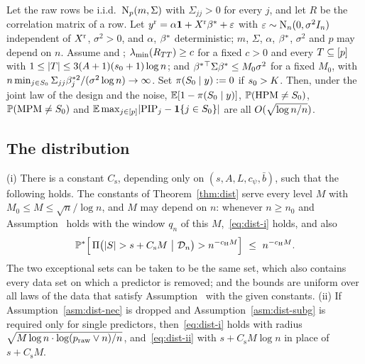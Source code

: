 \begin{supprem}\label{rem:thm2x}
Let the raw rows be i.i.d.\ $\mathrm{N}_p(m,\Sigma)$ with $\Sigma_{jj}>0$ for every $j$, and let $R$ be the correlation
matrix of a row. Let $y^{\mathrm r}=\alpha\mathbf{1}+X^{\mathrm r}\beta^*+\varepsilon$ with $\varepsilon\sim\mathrm{N}_n(0,\sigma^2I_n)$ independent of
$X^{\mathrm r}$, $\sigma^2>0$, and $\alpha$, $\beta^*$ deterministic; $m$, $\Sigma$, $\alpha$, $\beta^*$, $\sigma^2$ and $p$ may depend on
$n$. Assume  and ; $\lambda_{\min}(R_{TT})\ge c$ for a fixed $c>0$ and every $T\subseteq[p]$ with
$1\le\lvert T\rvert\le3(A+1)(s_0+1)\log n$; and $\beta^*{}^\top\Sigma\beta^*\le M_0\sigma^2$ for a fixed $M_0$, with
$n\min_{j\in S_0}\Sigma_{jj}\beta^{*2}_j/(\sigma^2\log n)\to\infty$. Set $\pi(S_0\mid y):=0$ if $s_0>K$. Then, under the joint law
of the design and the noise, $\operatorname{\mathbb{E}}[1-\pi(S_0\mid y)]$, $\mathbb{P}(\mathrm{HPM}\neq S_0)$, $\mathbb{P}(\mathrm{MPM}\neq S_0)$ and
$\operatorname{\mathbb{E}}\max_{j\in[p]}\lvert \mathrm{PIP}_j-\mathbf{1}\{j\in S_0\}\rvert$ are all $O(\sqrt{\log n/n})$.
\end{supprem}


\subsection{The distribution}\label{sec:supp-dist}

\begin{suppprop}\label{prop:dist}
\textup{(i)} There is a constant $C_{\mathrm s}$, depending only on $(s,A,L,c_\psi,\bar b)$, such that the following holds. The
constants of Theorem~\ref{thm:dist} serve every level $M$ with $M_0\le M\le\sqrt n/\log n$, and $M$ may depend on $n$:
whenever $n\ge n_0$ and Assumption~ holds with the window $q_n$ of this $M$,~\eqref{eq:dist-i} holds, and also
\begin{equation}\label{eq:dist-ii}
  \P^*\Big[\,\Pi\big(\abs{S}>s+C_{\mathrm s}M\ \big|\ \Dn\big)>n^{-c_{\mathrm H} M}\Big]\ \le\ n^{-c_{\mathrm H} M}.
\end{equation}
The two exceptional sets can be taken to be the same set, which also contains every data set on which a predictor is
removed; and the bounds are uniform over all laws of the data that satisfy
Assumption~ with the given constants.
\textup{(ii)} If Assumption~\ref{asm:dist-nec} is dropped and Assumption~\ref{asm:dist-subg} is
required only for single predictors, then~\eqref{eq:dist-i} holds with radius $\sqrt{M\log n\cdot\log(p_{\mathrm{raw}}\vee n)/n}$,
and~\eqref{eq:dist-ii} with $s+C_{\mathrm s}M\log n$ in place of $s+C_{\mathrm s}M$.
\end{suppprop}

